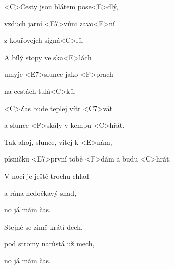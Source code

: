 
\zs
<C>Cesty jsou blátem pose<E>dlý,

vzduch jarní <E7>vůni zavo<F>ní

z kouřovejch signá<C>lů.

A bílý stopy ve ska<E>lách

umyje <E7>slunce jako <F>prach

na cestách tulá<C>ků.
\ks

\zr
<C>Zas bude teplej vítr <C7>vát

a slunce <F>skály v kempu <C>hřát.

Tak ahoj, slunce, vítej k <E>nám,

písničku <E7>první tobě <F>dám a budu <C>hrát.
\kr



\zs
V noci je ještě trochu chlad

a rána nedočkavý snad,

no já mám čas.

Stejně se zimě krátí dech,

pod stromy narůstá už mech,

no já mám čas.
\ks

\zr \kr
\zr \kr

\kp
